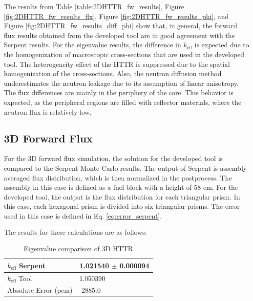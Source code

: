 The results from Table \ref{table:2DHTTR_fw_results}, Figure \ref{fig:2DHTTR_fw_results_flx}, Figure \ref{fig:2DHTTR_fw_results_phi}, and Figure \ref{fig:2DHTTR_fw_results_diff_phi} show that, in general, the forward flux results obtained from the developed tool are in good agreement with the Serpent results. For the eigenvalue results, the difference in $k_{\text{eff}}$ is expected due to the homogenization of macroscopic cross-sections that are used in the developed tool. The heterogeneity effect of the HTTR is suppressed due to the spatial homogenization of the cross-sections. Also, the neutron diffusion method underestimates the neutron leakage due to its assumption of linear anisotropy. The flux differences are mainly in the periphery of the core. This behavior is expected, as the peripheral regions are filled with reflector materials, where the neutron flux is relatively low. 

\subsection{3D Forward Flux}

For the 3D forward flux simulation, the solution for the developed tool is compared to the Serpent Monte Carlo results. The output of Serpent is assembly-averaged flux distribution, which is then normalized in the postprocess. The assembly in this case is defined as a fuel block with a height of 58 cm. For the developed tool, the output is the flux distribution for each triangular prism. In this case, each hexagonal prism is divided into six triangular prisms. The error used in this case is defined in Eq. \ref{eq:error_serpent}. 

The results for these calculations are as follows:
\begin{table}[H]
        \centering
        \caption{Eigenvalue comparison of 3D HTTR}
        \label{table:3DHTTR_fw_results}
        \begin{tabular}{ | M{3.5cm} | M{4cm} | } 
         \hline
         $k_{\text{eff}}$ Serpent & 1.021540 $\pm$ 0.000094  \\
         \hline
         $k_{\text{eff}}$ Tool & 1.050390  \\
         \hline
         Absolute Error (pcm) & -2885.0  \\
         \hline
        \end{tabular}
\end{table}

